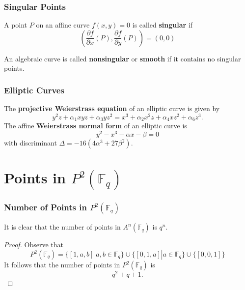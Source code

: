 \documentclass{beamer}
\begin{document}
    \begin{frame}
        \frametitle{Singular Points}
        \begin{definition}
            A point \(P\) on an affine curve \(f(x, y) = 0\) is called
            \textbf{singular} if
            \[\left(\frac{\partial f}{\partial x}(P),
            \frac{\partial f}{\partial y}(P)\right) = (0, 0)\]
        \end{definition}
        \vfill
        \begin{definition}
            An algebraic curve is called \textbf{nonsingular} or
            \textbf{smooth} if it contains no singular points.
        \end{definition}
    \end{frame}

    \begin{frame}
        \frametitle{Elliptic Curves}
        The \textbf{projective Weierstrass equation} of an elliptic curve is
        given by
        \[y^2z + \alpha_1xyz + \alpha_3yz^2 =
        x^3 + \alpha_2x^2z + \alpha_4xz^2 + \alpha_6z^3.\]
        \vfill
        The affine \textbf{Weierstrass normal form} of an elliptic curve is
        \[y^2 - x^3 - \alpha x - \beta = 0\] with
        discriminant \(\Delta = -16(4\alpha^3 + 27\beta^2)\).
    \end{frame}

    \section{Points in \(P^2(\mathbb{F}_q)\)}
    \begin{frame}[label=points]
        \frametitle{Number of Points in \(P^2(\mathbb{F}_q)\)}
        It is clear that the number of points in \(A^n(\mathbb{F}_q)\)
        is \(q^n\).
        \vfill
        \begin{proof}
            Observe that
            \[P^2(\mathbb{F}_q) = \{[1, a, b] | a, b \in \mathbb{F}_q\}
                \cup \{[0, 1, a] | a \in \mathbb{F}_q\}
                \cup \{[0, 0, 1]\}\]
            It follows that the number of points in \(P^2(\mathbb{F}_q)\)
            is \[q^2 + q + 1.\]
        \end{proof}
    \end{frame}
\end{document}
